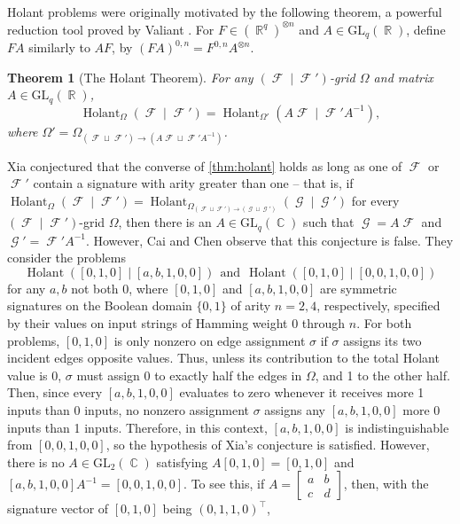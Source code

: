 \documentclass{article}
\newtheorem{theorem}{Theorem}[section]
\theoremstyle{remark}
\theoremstyle{definition}
\DeclareMathOperator{\rr}{\mathbb{R}}
\DeclareMathOperator{\cc}{\mathbb{C}}
\DeclareMathOperator{\fc}{\mathcal{F}}
\DeclareMathOperator{\gc}{\mathcal{G}}
\DeclareMathOperator{\holant}{Holant}
\begin{document}
Holant problems were originally motivated by the following theorem, a powerful reduction tool
proved by Valiant \cite{valiant}.
For $F \in (\rr^q)^{\otimes n}$ and $A \in \text{GL}_q(\rr)$, define $FA$ similarly
to $AF$, by $(FA)^{0,n} = F^{0,n}A^{\otimes n}$.
\begin{theorem}[The Holant Theorem]
    For any $(\fc \mid \fc')$-grid $\Omega$ and matrix $A \in \text{GL}_q(\rr)$,
    \[
        \holant_{\Omega}(\fc \mid \fc') = \holant_{\Omega'}
        (A\fc \mid \fc' A^{-1}),
    \]
    where $\Omega' = \Omega_{(\fc\sqcup\fc') \to (A\fc \sqcup \fc' A^{-1})}$.
    \label{thm:holant}
\end{theorem}
Xia \cite{xia} conjectured that the converse of \autoref{thm:holant} holds as long as one of
$\fc$ or $\fc'$ contain a signature with arity greater than one -- that is, if 
$\holant_{\Omega}(\fc \mid \fc') = \holant_{\Omega_{(\fc\sqcup\fc') \to (\gc \sqcup \gc')}}(\gc \mid \gc')$
for every $(\fc \mid \fc')$-grid $\Omega$, then there is an $A \in \text{GL}_q(\cc)$ 
such that $\gc = A\fc$ and $\gc' = \fc' A^{-1}$. However, Cai and Chen
\cite[Section 7.1.1]{cai_chen_2017} observe that this conjecture is false. They consider the problems
\[
    \holant([0,1,0] \mid [a,b,1,0,0]) ~~\text{and}~~ \holant([0,1,0] \mid [0,0,1,0,0])
\]
for any $a,b$ not both 0,
where $[0,1,0]$ and $[a,b,1,0,0]$ are symmetric signatures on the Boolean domain $\{0,1\}$ 
of arity $n=2,4$, respectively, specified by their values on input strings of Hamming
weight $0$ through $n$.
For both problems, $[0,1,0]$ is only nonzero on edge assignment $\sigma$ if $\sigma$ assigns its two
incident edges opposite values. Thus, unless its contribution to the total Holant value is 0, 
$\sigma$ must assign 0 to exactly half the edges in $\Omega$, and 1 to the other half. Then, since
every $[a,b,1,0,0]$ evaluates to zero
whenever it receives more 1 inputs than 0 inputs, no nonzero assignment $\sigma$ assigns any
$[a,b,1,0,0]$ more 0 inputs than 1 inputs. Therefore, in this context,
$[a,b,1,0,0]$ is indistinguishable from $[0,0,1,0,0]$, so the hypothesis of Xia's conjecture is satisfied. 
However, there is no $A \in \text{GL}_2(\cc)$ satisfying $A[0,1,0] = [0,1,0]$ and 
$[a,b,1,0,0]A^{-1} = [0,0,1,0,0]$. To see this, if $A = \begin{bmatrix} a & b \\ c & d\end{bmatrix}$, then, with the signature vector of $[0,1,0]$ being $(0,1,1,0)^\top$,
\end{document}
